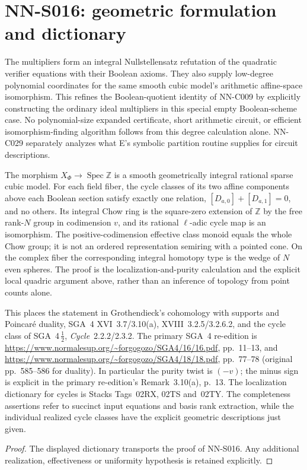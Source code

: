 \section{NN-S016: geometric formulation and dictionary}
\begin{geometricstatement}[NN-S016]
The multipliers form an integral Nullstellensatz refutation of the
quadratic verifier equations with their Boolean axioms. They also
supply low-degree polynomial coordinates for the same smooth cubic
model's arithmetic affine-space isomorphism. This refines the
Boolean-quotient identity of NN-C009 by explicitly constructing the
ordinary ideal multipliers in this special empty Boolean-scheme
case. No polynomial-size expanded certificate, short arithmetic
circuit, or efficient isomorphism-finding algorithm follows from
this degree calculation alone. NN-C029 separately analyzes what E's
symbolic partition routine supplies for circuit descriptions.

The morphism $X_\Phi\to\operatorname{Spec}\mathbb Z$ is a smooth
geometrically integral rational sparse cubic model. For each field fiber,
the cycle classes of its two affine components above each Boolean section
satisfy exactly one relation, $[D_{a,0}]+[D_{a,1}]=0$, and no others.
Its integral Chow ring is the square-zero extension of $\mathbb Z$ by
the free rank-$N$ group in codimension $v$, and its rational $\ell$-adic
cycle map is an isomorphism. The positive-codimension effective class
monoid equals the whole Chow group; it is not an ordered representation
semiring with a pointed cone. On the complex fiber the corresponding
integral homotopy type is the wedge of $N$ even spheres. The proof is
the localization-and-purity calculation and the explicit local
quadric argument above, rather than an inference of topology from
point counts alone.

This places the statement in Grothendieck's cohomology with supports and
Poincar\'e duality, SGA~4 XVI~3.7/3.10(a), XVIII~3.2.5/3.2.6.2, and
the cycle class of SGA~4\,$\frac12$, \emph{Cycle}~2.2.2/2.3.2.
The primary SGA~4 re-edition is
\url{https://www.normalesup.org/~forgogozo/SGA4/16/16.pdf}, pp.~11--13,
and \url{https://www.normalesup.org/~forgogozo/SGA4/18/18.pdf},
pp.~77--78 (original pp.~585--586 for duality).
In particular the purity twist is $(-v)$; the minus sign is explicit
in the primary re-edition's Remark~3.10(a), p.~13.
The localization dictionary for cycles is Stacks Tags~02RX, 02TS and~02TY.
The completeness assertions refer to succinct input equations and basis
rank extraction, while the individual realized cycle classes have the
explicit geometric descriptions just given.
\end{geometricstatement}
\begin{proof} The displayed dictionary transports the proof of NN-S016. Any additional realization, effectiveness or uniformity hypothesis is retained explicitly.\end{proof}


